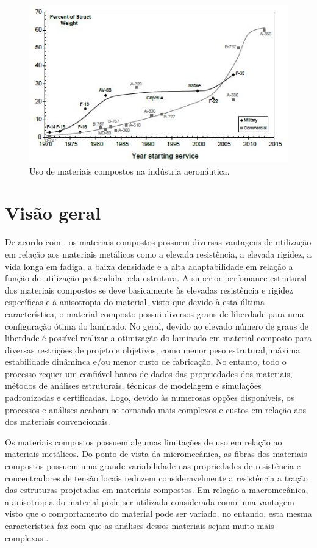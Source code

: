 \begin{figure}[h]
	\caption{\label{fig_usecomposites}Uso de materiais compostos na indústria aeronáutica.}
  \centering
  \includegraphics[scale=1.1]{figura/UseOfComposites}
\end{figure}

\section{Visão geral}
De acordo com \cite{daniel2006engineering}, os materiais compostos possuem diversas vantagens de utilização em relação aos materiais metálicos como a elevada resistência, a elevada rigidez, a vida longa em fadiga, a baixa densidade e a alta adaptabilidade em relação a função de utilização pretendida pela estrutura. A superior perfomance estrutural dos materiais compostos se deve basicamente às elevadas resistência e rigidez específicas e à anisotropia do material, visto que devido à esta última característica, o material composto possui diversos graus de liberdade para uma configuração ótima do laminado. No geral, devido ao elevado número de graus de liberdade é possível realizar a otimização do laminado em material composto para diversas restrições de projeto e objetivos, como menor peso estrutural, máxima estabilidade dinâminca e/ou menor custo de fabricação. No entanto, todo o processo requer um confiável banco de dados das propriedades dos materiais, métodos de análises estruturais, técnicas de modelagem e simulações padronizadas e certificadas. Logo, devido às numerosas opções disponíveis, os processos e análises acabam se tornando mais complexos e custos em relação aos dos materiais convencionais.

Os materiais compostos possuem algumas limitações de uso em relação ao materiais metálicos. Do ponto de vista da micromecânica, as fibras dos materiais compostos possuem uma grande variabilidade nas propriedades de resistência e concentradores de tensão locais reduzem consideravelmente a resistência a tração das estruturas projetadas em materiais compostos. Em relação a macromecânica, a anisotropia do material pode ser utilizada considerada como uma vantagem visto que o comportamento do material pode ser variado, no entando, esta mesma característica faz com que as análises desses materiais sejam muito mais complexas \cite{daniel2006engineering}.

